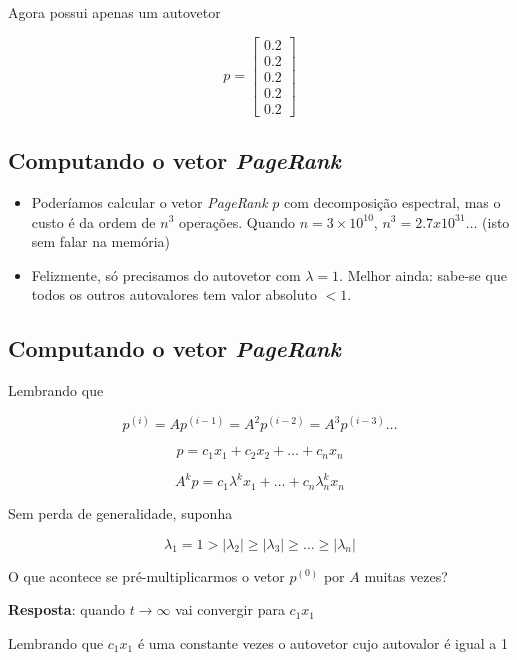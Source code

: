\documentclass[
  letterpaper,
  DIV=11,
  numbers=noendperiod]{scrartcl}
\begin{document}
Agora possui apenas um autovetor

\[ p = \begin{bmatrix}0.2\\0.2\\0.2\\0.2\\0.2\end{bmatrix}\]

\hypertarget{computando-o-vetor-pagerank}{%
\subsection{\texorpdfstring{Computando o vetor
\emph{PageRank}}{Computando o vetor PageRank}}\label{computando-o-vetor-pagerank}}

\begin{itemize}
\item
  Poderíamos calcular o vetor \emph{PageRank} \(p\) com decomposição
  espectral, mas o custo é da ordem de \(n^3\) operações. Quando
  \(n=3\times 10^{10}\), \(n^3 = 2.7x10^{31}…\) (isto sem falar na
  memória)
\item
  Felizmente, só precisamos do autovetor com \(\lambda=1\). Melhor
  ainda: sabe-se que todos os outros autovalores tem valor absoluto
  \(< 1\).
\end{itemize}

\hypertarget{computando-o-vetor-pagerank-1}{%
\subsection{\texorpdfstring{Computando o vetor
\emph{PageRank}}{Computando o vetor PageRank}}\label{computando-o-vetor-pagerank-1}}

Lembrando que

\[ p^{(i)} = A p^{(i-1)}= A^2p^{(i-2)} = A^3p^{(i-3)}\ldots\]

\[p = c_1x_1 + c_2x_2 + \ldots + c_nx_n\]

\[A^kp = c_1\lambda^k x_1 + \ldots + c_n\lambda_n^kx_n\]

Sem perda de generalidade, suponha

\[ \lambda_1 = 1 > \vert \lambda_2\vert \ge \vert \lambda_3 \vert \ge \ldots \ge \vert \lambda_n\vert\]

O que acontece se pré-multiplicarmos o vetor \(p^{(0)}\) por \(A\)
muitas vezes?

\textbf{Resposta}: quando \(t\rightarrow \infty\) vai convergir para
\(c_1x_1\)

\begin{tcolorbox}[enhanced jigsaw, colbacktitle=quarto-callout-note-color!10!white, colframe=quarto-callout-note-color-frame, opacityback=0, breakable, toprule=.15mm, leftrule=.75mm, titlerule=0mm, coltitle=black, bottomtitle=1mm, colback=white, toptitle=1mm, title=\textcolor{quarto-callout-note-color}{\faInfo}\hspace{0.5em}{Note}, arc=.35mm, rightrule=.15mm, bottomrule=.15mm, left=2mm, opacitybacktitle=0.6]
Lembrando que \(c_1x_1\) é uma constante vezes o autovetor cujo
autovalor é igual a 1
\end{tcolorbox}
\end{document}
